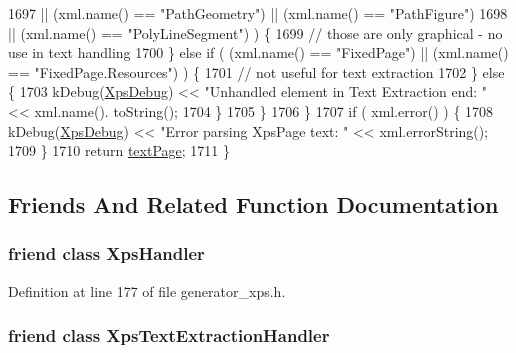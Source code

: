 \begin{DoxyCode}
1697                         || (xml.name() == \textcolor{stringliteral}{"PathGeometry"}) || (xml.name() == \textcolor{stringliteral}{"PathFigure"})
1698                         || (xml.name() == \textcolor{stringliteral}{"PolyLineSegment"}) ) \{
1699                 \textcolor{comment}{// those are only graphical - no use in text handling}
1700             \} \textcolor{keywordflow}{else} \textcolor{keywordflow}{if} ( (xml.name() == \textcolor{stringliteral}{"FixedPage"}) || (xml.name() == \textcolor{stringliteral}{"FixedPage.Resources"}) ) \{
1701                 \textcolor{comment}{// not useful for text extraction}
1702             \} \textcolor{keywordflow}{else} \{
1703                 kDebug(\hyperlink{generator__xps_8cpp_a00c0825a8bf77ed142d9a5a205d66f3c}{XpsDebug}) << \textcolor{stringliteral}{"Unhandled element in Text Extraction end: "} << xml.name().
      toString();
1704             \}
1705         \}
1706     \}
1707     \textcolor{keywordflow}{if} ( xml.error() ) \{
1708         kDebug(\hyperlink{generator__xps_8cpp_a00c0825a8bf77ed142d9a5a205d66f3c}{XpsDebug}) << \textcolor{stringliteral}{"Error parsing XpsPage text: "} << xml.errorString();
1709     \}
1710     \textcolor{keywordflow}{return} \hyperlink{classXpsPage_a6aee6a94650e230c3f84cf75ae4bc55f}{textPage};
1711 \}
\end{DoxyCode}


\subsection{Friends And Related Function Documentation}
\hypertarget{classXpsPage_ad0fe4fbffbab0a0e41d5ac136f260079}{
\subsubsection[{Xps\+Handler}]{\setlength{\rightskip}{0pt plus 5cm}friend class {\bf Xps\+Handler}\hspace{0.3cm}{\ttfamily [friend]}}}\label{classXpsPage_ad0fe4fbffbab0a0e41d5ac136f260079}


Definition at line 177 of file generator\+\_\+xps.\+h.

\hypertarget{classXpsPage_a1691bf1641e80a5ce07ba96e3c7702e1}{
\subsubsection[{Xps\+Text\+Extraction\+Handler}]{\setlength{\rightskip}{0pt plus 5cm}friend class Xps\+Text\+Extraction\+Handler\hspace{0.3cm}{\ttfamily [friend]}}}\label{classXpsPage_a1691bf1641e80a5ce07ba96e3c7702e1}



